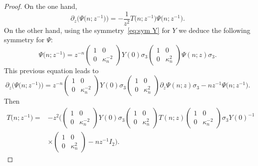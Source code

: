 \documentclass[pdftex]{sigma}%
\numberwithin{equation}{section}
\begin{document}
	\begin{proof}
		On the one hand,
		\begin{equation*}
		\partial_z\big(\Psi\big(n;z^{-1}\big)\big)=-\dfrac{1}{z^2}T\big(n;z^{-1}\big)\Psi\big(n;z^{-1}\big).
		\end{equation*}
		On the other hand, using the symmetry~\eqref{eq:sym Y} for $Y$ we deduce the following symmetry for $\Psi$:
\begin{equation*}
\Psi\big(n;z^{-1}\big)=z^{-n}\begin{pmatrix}
			1&0\\
			0& \kappa_{n}^{-2}
		\end{pmatrix}Y(0)\sigma_3\begin{pmatrix}
			1&0\\
			0& \kappa_{n}^{2}
		\end{pmatrix}\Psi(n;z)\sigma_3.
\end{equation*}
		This previous equation leads to
		\begin{equation*}
		\partial_z\big(\Psi\big(n;z^{-1}\big)\big)=z^{-n}\begin{pmatrix}
			1&0\\
			0& \kappa_{n}^{-2}
		\end{pmatrix}Y(0)\sigma_3\begin{pmatrix}
			1&0\\
			0& \kappa_{n}^{2}
		\end{pmatrix}\partial_z\Psi(n;z)\sigma_3-nz^{-1}\Psi\big(n;z^{-1}\big).
		\end{equation*}
		Then
		\begin{align*}
		T\big(n;z^{-1}\big)={}&-z^2\bigg(\!\begin{pmatrix}
			1&0\\
			0& \kappa_{n}^{-2}
		\end{pmatrix}Y(0)\sigma_3\begin{pmatrix}
			1&0\\
			0& \kappa_{n}^{2}
		\end{pmatrix}T(n;z)\begin{pmatrix}
			1&0\\
			0& \kappa_{n}^{-2}
		\end{pmatrix}\sigma_3Y(0)^{-1}
\\
&\times\begin{pmatrix}
			1&0\\
			0& \kappa_{n}^{2}
		\end{pmatrix}-nz^{-1}I_2\bigg).\tag*{\qed}
\end{align*}
\renewcommand{\qed}{}
\end{proof}
\end{document}

